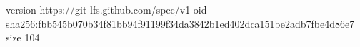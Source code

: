 version https://git-lfs.github.com/spec/v1
oid sha256:fbb545b070b34f81bb94f91199f34da3842b1ed402dca151be2adb7fbe4d86e7
size 104
